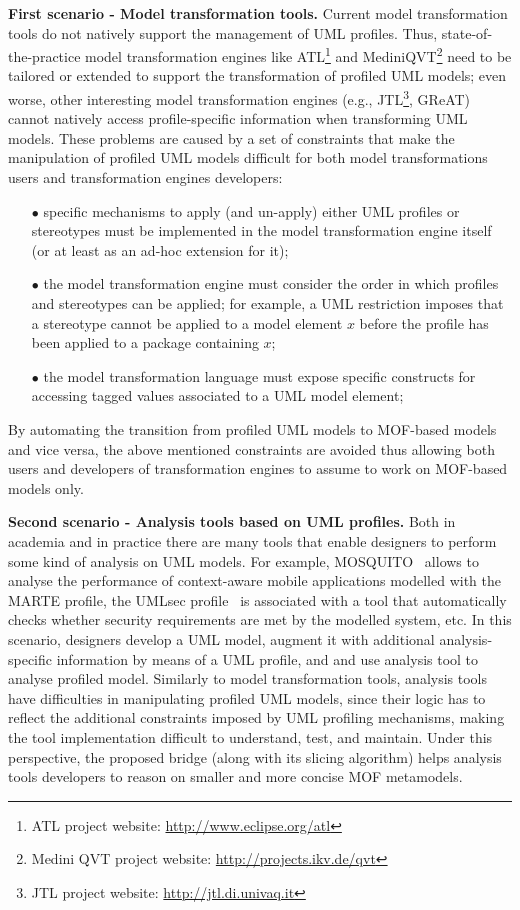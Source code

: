 \textbf{First scenario - Model transformation tools.}
Current model transformation tools do not natively support the management of UML profiles.
Thus, state-of-the-practice model transformation engines
like ATL\footnote{ATL project website: \small{\url{http://www.eclipse.org/atl}}} and
MediniQVT\footnote{Medini QVT project website: \small{\url{http://projects.ikv.de/qvt}}}
need to be tailored or extended to support the transformation of profiled UML models;
even worse, other interesting model transformation engines (e.g.,
JTL\footnote{JTL project website: \small{\url{http://jtl.di.univaq.it}}}, GReAT)
cannot natively access profile-specific information when transforming UML models.
These problems are caused by a set of constraints that make the manipulation of profiled UML models difficult for both model transformations users and transformation engines developers:
%
\begin{itemize}
	\item[$\bullet$] specific mechanisms to apply (and un-apply) either UML profiles or stereotypes must be implemented
	in the model transformation engine itself (or at least as an ad-hoc extension for it);
	\item[$\bullet$] the model transformation engine must consider the order in which profiles and stereotypes can be applied;
	for example, a UML restriction imposes that a stereotype cannot be applied to a model element $x$ before
	the profile has been applied to a package containing $x$;
	\item[$\bullet$] the model transformation language must expose specific constructs for accessing tagged values associated to a UML model element;
\end{itemize}
%
By automating the transition from profiled UML models to MOF-based models and vice versa, the above mentioned constraints
are avoided thus allowing both users and developers of transformation engines to assume to work on MOF-based models only.

\textbf{Second scenario - Analysis tools based on UML profiles.}
Both in academia and in practice there are many tools that enable designers to perform some kind of analysis on UML models.
For example, MOSQUITO~\cite{perfMarte} allows to analyse the performance of context-aware mobile
applications modelled with the MARTE profile,
the UMLsec profile~\cite{securityUMLsec} is associated with a tool that automatically checks whether security
requirements are met by the modelled system, etc.
In this scenario, designers develop a UML model, augment it with additional analysis-specific information by means of a UML profile, and and use analysis tool to analyse profiled model.
Similarly to model transformation tools, analysis tools have difficulties in manipulating profiled UML models, since
their logic has to reflect the additional constraints imposed by UML profiling mechanisms, making the tool
implementation difficult to understand, test, and maintain.
Under this perspective, the proposed bridge (along with its slicing algorithm)
helps analysis tools developers to reason on smaller and more concise MOF metamodels.

